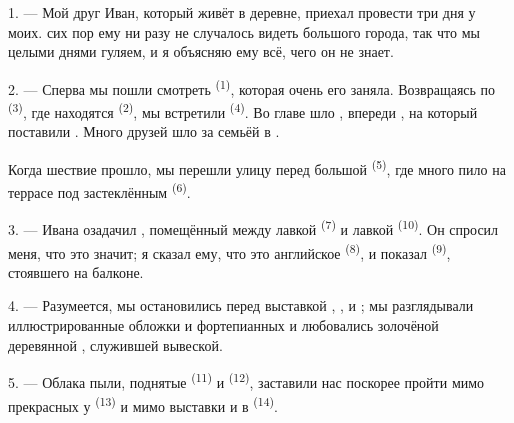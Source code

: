 
\VUsaut{4.0mm}
\VUsaut{3.0mm}

\VUsaut{3.0mm}

1. --- Мой друг Иван, который живёт в деревне, приехал провести три дня у
моих.  сих пор ему ни разу не случалось видеть большого города,
так что мы целыми днями гуляем, и я объясняю ему всё, чего он не знает.

2. --- Сперва мы пошли смотреть  \textsuperscript{(1)},
которая очень его заняла. Возвращаясь по  \textsuperscript{(3)}, где
находятся  \textsuperscript{(2)}, мы встретили
 \textsuperscript{(4)}. Во главе 
шло , впереди , на который поставили
. Много друзей шло за семьёй в .

Когда шествие прошло, мы перешли улицу перед большой 
\textsuperscript{(5)}, где много  пило  на
террасе под застеклённым  \textsuperscript{(6)}.

3. --- Ивана озадачил , помещённый между лавкой
 \textsuperscript{(7)} и лавкой
 \textsuperscript{(10)}. Он спросил меня, что это значит; я
сказал ему, что это английское  \textsuperscript{(8)}, и
показал  \textsuperscript{(9)}, стоявшего на балконе.

\VUsaut{3.0mm}

4. --- Разумеется, мы остановились перед выставкой
, ,  и
; мы разглядывали иллюстрированные обложки  и
фортепианных  и любовались золочёной деревянной ,
служившей вывеской.

5. --- Облака пыли, поднятые  \textsuperscript{(11)} и
 \textsuperscript{(12)}, заставили нас поскорее
пройти мимо прекрасных  у 
\textsuperscript{(13)} и мимо выставки  и  в
 \textsuperscript{(14)}.

